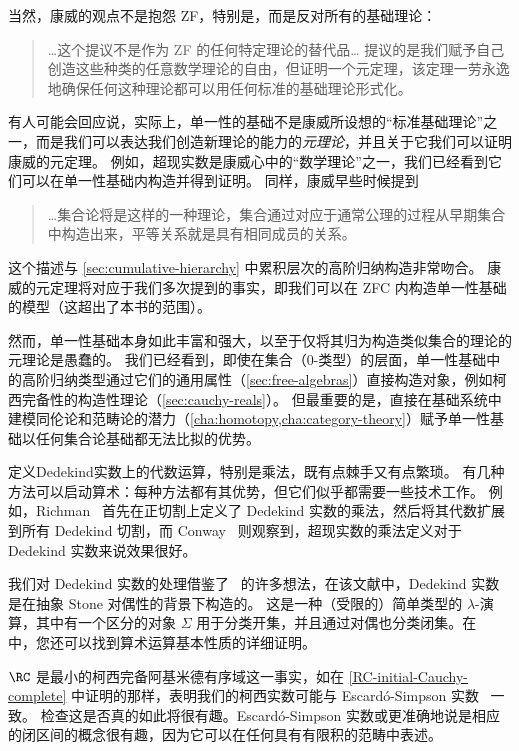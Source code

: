 当然，康威的观点不是抱怨 ZF，特别是，而是反对所有的基础理论：
\begin{quote}\footnotesize
\dots 这个提议不是作为 ZF 的任何特定理论的替代品\dots{}
提议的是我们赋予自己创造这些种类的任意数学理论的自由，但证明一个元定理，该定理一劳永逸地确保任何这种理论都可以用任何标准的基础理论形式化。
\end{quote}
有人可能会回应说，实际上，单一性的基础不是康威所设想的“标准基础理论”之一，而是我们可以表达我们创造新理论的能力的\emph{元理论}，并且关于它我们可以证明康威的元定理。
例如，超现实数是康威心中的“数学理论”之一，我们已经看到它们可以在单一性基础内构造并得到证明。
同样，康威早些时候提到
\begin{quote}\footnotesize
\dots 集合论将是这样的一种理论，集合通过对应于通常公理的过程从早期集合中构造出来，平等关系就是具有相同成员的关系。
\end{quote}
这个描述与 \cref{sec:cumulative-hierarchy} 中累积层次的高阶归纳构造非常吻合。
康威的元定理将对应于我们多次提到的事实，即我们可以在 ZFC 内构造单一性基础的模型（这超出了本书的范围）。

然而，单一性基础本身如此丰富和强大，以至于仅将其归为构造类似集合的理论的元理论是愚蠢的。
我们已经看到，即使在集合（0-类型）的层面，单一性基础中的高阶归纳类型通过它们的通用属性（\cref{sec:free-algebras}）直接构造对象，例如柯西完备性的构造性理论（\cref{sec:cauchy-reals}）。
但最重要的是，直接在基础系统中建模同伦论和范畴论的潜力（\cref{cha:homotopy,cha:category-theory}）赋予单一性基础以任何集合论基础都无法比拟的优势。
%

%

\sectionNotes

定义Dedekind实数上的代数运算，特别是乘法，既有点棘手又有点繁琐。
有几种方法可以启动算术：每种方法都有其优势，但它们似乎都需要一些技术工作。
例如，Richman~\cite{Richman:reals} 首先在正切割上定义了 Dedekind 实数的乘法，然后将其代数扩展到所有 Dedekind 切割，而 Conway~\cite{conway:onag} 则观察到，超现实数的乘法定义对于 Dedekind 实数来说效果很好。

我们对 Dedekind 实数的处理借鉴了~\cite{BauerTaylor09} 的许多想法，在该文献中，Dedekind 实数是在抽象 Stone 对偶性的背景下构造的。
%
这是一种（受限的）简单类型的 $\lambda$-演算，其中有一个区分的对象 $\Sigma$ 用于分类开集，并且通过对偶也分类闭集。在~\cite{BauerTaylor09} 中，您还可以找到算术运算基本性质的详细证明。

$\RC$ 是最小的柯西完备阿基米德有序域这一事实，如在 \cref{RC-initial-Cauchy-complete} 中证明的那样，表明我们的柯西实数可能与 Escard{\'o}-Simpson 实数~\cite{EscardoSimpson:01} 一致。
%
检查这是否真的如此将很有趣。Escard{\'o}-Simpson 实数或更准确地说是相应的闭区间的概念很有趣，因为它可以在任何具有有限积的范畴中表述。

